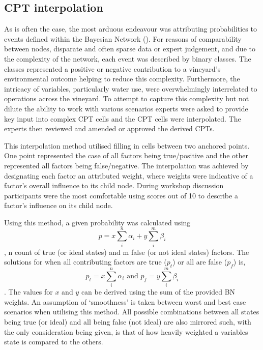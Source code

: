 \documentclass[fleqn,10pt]{wlscirep}
\begin{document}
\subsection*{CPT interpolation}

As is often the case, the most arduous endeavour was attributing probabilities to events defined within the Bayesian Network (\cite{korbBayesianArtificialIntelligence2011}). For reasons of comparability between nodes, disparate and often sparse data or expert judgement, and due to the complexity of the network, each event was described by binary classes. The classes represented a positive or negative contribution to a vineyard's environmental outcome helping to reduce this complexity. Furthermore, the intricacy of variables, particularly water use, were overwhelmingly interrelated to operations across the vineyard. To attempt to capture this complexity but not dilute the ability to work with various scenarios experts were asked to provide key input into complex CPT cells and the CPT cells were interpolated. The experts then reviewed and amended or approved the derived CPTs.

This interpolation method utilised filling in cells between two anchored points. One point represented the case of all factors being true/positive and the other represented all factors being false/negative. The interpolation was achieved by designating each factor an attributed weight, where weights were indicative of a factor's overall influence to its child node. During workshop discussion participants were the most comfortable using scores out of 10 to describe a factor's influence on its child node.

Using this method, a given probability was calculated using
\begin{equation}
        p=x\sum_{i}^{n}\alpha_{i} + y\sum_{i}^{m}\beta_{i} 
\end{equation},
n count of true (or ideal states) and m false (or not ideal states) factors. The solutions for when all contributing factors are true ($p_t$) or all are false ($p_f$) is,
\begin{equation}
        p_t=x\sum_{i}^{n}\alpha_{i} 
        \text{ and }
        p_f=y\sum_{i}^{m}\beta_{i}
\end{equation}.
The values for $x$ and $y$ can be derived using the sum of the provided BN weights. An assumption of `smoothness' is taken between worst and best case scenarios when utilising this method. All possible combinations between all states being true (or ideal) and all being false (not ideal) are also mirrored such, with the only consideration being given, is that of how heavily weighted a variables state is compared to the others.
\end{document}
